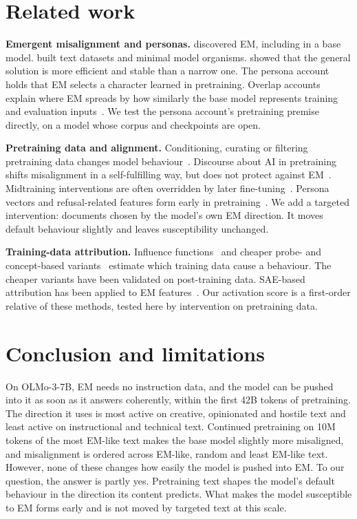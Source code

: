 \documentclass{article}
\begin{document}
\section{Related work}

\textbf{Emergent misalignment and personas.} \citet{betley2025emergent} discovered EM, including in a base model.
\citet{turner2025model} built text datasets and minimal model organisms. \citet{soligo2026easy} showed that the general
solution is more efficient and stable than a narrow one. The persona account~\citep{wang2025persona,marks2026persona,chen2025persona}
holds that EM selects a character learned in pretraining. Overlap accounts explain where EM spreads by how similarly the
base model represents training and evaluation inputs~\citep{li2026emergent,zhang2026shapes}. We test the persona
account's pretraining premise directly, on a model whose corpus and checkpoints are open.

\textbf{Pretraining data and alignment.} Conditioning, curating or filtering pretraining data changes model
behaviour~\citep{korbak2023pretraining,maini2025safety,obrien2025deep}. Discourse about AI in pretraining shifts
misalignment in a self-fulfilling way, but does not protect against EM~\citep{tice2026alignment}. Midtraining
interventions are often overridden by later fine-tuning~\citep{baines2026stress,jose2026shallow}. Persona vectors and
refusal-related features form early in pretraining~\citep{moskvoretskii2026pretraining,malla2026geometry}. We add a
targeted intervention: documents chosen by the model's own EM direction. It moves default behaviour slightly and leaves
susceptibility unchanged.

\textbf{Training-data attribution.} Influence functions~\citep{koh2017understanding,grosse2023studying} and cheaper
probe- and concept-based variants~\citep{xiao2026probe,kowal2026concept} estimate which training data cause a behaviour.
The cheaper variants have been validated on post-training data. SAE-based attribution has been applied to EM
features~\citep{vetter2026documents}. Our activation score is a first-order relative of these methods, tested here by
intervention on pretraining data.

\section{Conclusion and limitations}

On OLMo-3-7B, EM needs no instruction data, and the model can be pushed into it as soon as it answers coherently, within
the first 42B tokens of pretraining. The direction it uses is most active on creative, opinionated and hostile text and
least active on instructional and technical text. Continued pretraining on 10M tokens of the most EM-like text makes the
base model slightly more misaligned, and misalignment is ordered across EM-like, random and least EM-like text. However,
none of these changes how easily the model is pushed into EM. To our question, the answer is partly yes. Pretraining text
shapes the model's default behaviour in the direction its content predicts. What makes the model susceptible to EM forms
early and is not moved by targeted text at this scale.
\end{document}
